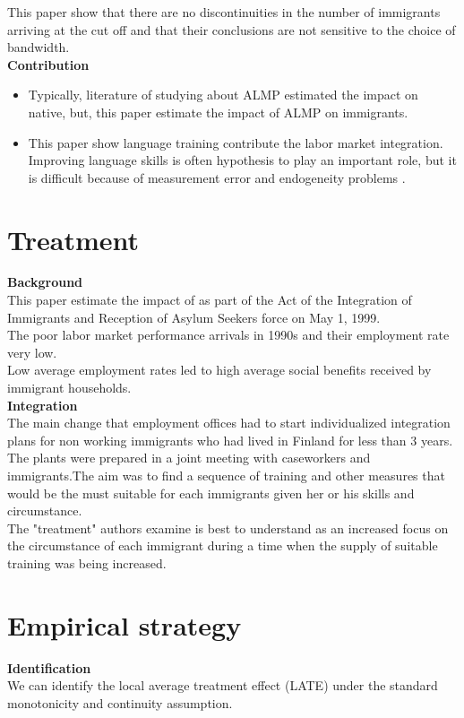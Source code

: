 \documentclass[../root]{subfiles}
\begin{document}
        This paper show that there are no discontinuities in the number of immigrants arriving at the cut off and that their conclusions are not sensitive to the choice of bandwidth. \\
    
    {\bf Contribution} 
    \begin{itemize}
        \item Typically, literature of studying about ALMP estimated the impact on native, but, this paper estimate the impact of ALMP on immigrants.
        \item This paper show language training contribute the labor market integration. Improving language skills is often hypothesis to play an important role, but it is difficult because of measurement error and endogeneity problems . 
    \end{itemize}
    
    \section{Treatment}
    {\bf Background} \\
    This paper estimate the impact of as part of the Act of the Integration of Immigrants and Reception of Asylum Seekers force on May 1, 1999. \\
    The poor labor market performance arrivals in 1990s and their employment rate very low. 　\\
    Low average employment rates led to high average social benefits received by immigrant households. \\
    {\bf Integration} \\
    The main change that employment offices had to start individualized  integration plans for non working immigrants who had lived in Finland for less than 3 years.  \\
    The plants were prepared in a joint meeting with caseworkers and immigrants.The aim was to find a sequence of training and other measures that would be the must suitable for each immigrants given her or his skills and circumstance. 　\\
    The "treatment" authors examine is best to understand as an increased focus on the circumstance of each immigrant during a time when the supply of suitable training was being increased. 
    
    
    \section{Empirical strategy}
    {\bf Identification} \\
    We can identify the local average treatment effect (LATE) under the standard monotonicity and continuity assumption.
    
\end{document}
